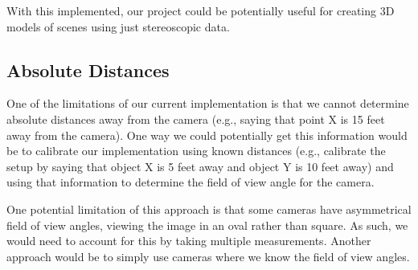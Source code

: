 With this implemented, our project could be potentially useful for creating 3D models of scenes using just stereoscopic data.

\subsection{Absolute Distances}
One of the limitations of our current implementation is that we cannot determine absolute distances away from the camera (e.g., saying that point X is 15 feet away from the camera). One way we could potentially get this information would be to calibrate our implementation using known distances (e.g., calibrate the setup by saying that object X is 5 feet away and object Y is 10 feet away) and using that information to determine the field of view angle for the camera. 

One potential limitation of this approach is that some cameras have asymmetrical field of view angles, viewing the image in an oval rather than square. As such, we would need to account for this by taking multiple measurements. Another approach would be to simply use cameras where we know the field of view angles.

